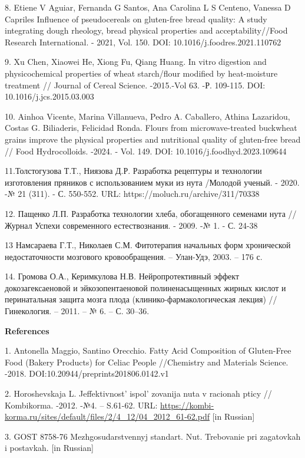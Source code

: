 8. Etiene V Aguiar, Fernanda G Santos, Ana Carolina L S Centeno, Vanessa
D Capriles Influence of pseudocereals on gluten-free bread quality: A
study integrating dough rheology, bread physical properties and
acceptability//Food Research International. - 2021, Vol. 150. DOI:
10.1016/j.foodres.2021.110762

9. Xu Chen, Xiaowei He, Xiong Fu, Qiang Huang. In vitro digestion and
physicochemical properties of wheat starch/flour modified by
heat-moisture treatment // Journal of Cereal Science. -2015.-Vol 63. -Р.
109-115. DOI: 10.1016/j.jcs.2015.03.003

10. Ainhoa Vicente, Marina Villanueva, Pedro A. Caballero, Athina
Lazaridou, Costas G. Biliaderis, Felicidad Ronda. Flours from
microwave-treated buckwheat grains improve the physical properties and
nutritional quality of gluten-free bread // Food Hydrocolloids. -2024. -
Vol. 149. DOI: 10.1016/j.foodhyd.2023.109644

11.Толстогузова Т.Т., Ниязова Д.Р. Разработка рецептуры и технологии
изготовления пряников с использованием муки из нута /Молодой ученый. -
2020. -№ 21 (311). - С. 550-552. URL:
https://moluch.ru/archive/311/70338

12. Пащенко Л.П. Разработка технологии хлеба, обогащенного семенами нута
//Журнал Успехи современного естествознания. - 2009. -№ 1. - С. 24-38

13 Намсараева Г.Т., Николаев С.М. Фитотерапия начальных форм хронической
недостаточности мозгового кровообращения. -- Улан-Удэ, 2003. -- 176 с.

14. Громова О.А., Керимкулова Н.В. Нейропротективный эффект
докозагексаеновой и эйкозопентаеновой полиненасыщенных жирных кислот и
перинатальная защита мозга плода (клинико-фармакологическая лекция) //
Гинекология. -- 2011. -- № 6. -- С. 30--36.

{\bfseries References}

1. Antonella Maggio, Santino Orecchio. Fatty Acid Composition of
Gluten-Free Food (Bakery Products) for Celiac People //Chemistry and
Materials Science. -2018. DOI:10.20944/preprints201806.0142.v1

2. Horoshevskaja L. Jeffektivnost'{}
ispol' zovanija nuta v racionah pticy // Kombikorma.
-2012. -№4. -- S.61-62. URL:
\url{https://kombi-korma.ru/sites/default/files/2/4_12/04_2012_61-62.pdf}
{[}in Russian{]}

3. GOST 8758-76 Mezhgosudarstvennyj standart. Nut. Trebovanie pri
zagatovkah i postavkah. {[}in Russian{]}


